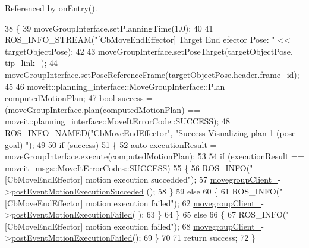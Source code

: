 Referenced by on\+Entry().


\begin{DoxyCode}
38 \{
39     moveGroupInterface.setPlanningTime(1.0);
40 
41     ROS\_INFO\_STREAM(\textcolor{stringliteral}{"[CbMoveEndEffector] Target End efector Pose: "} << targetObjectPose);
42 
43     moveGroupInterface.setPoseTarget(targetObjectPose, \hyperlink{classmoveit__z__client_1_1CbMoveEndEffector_abd92e9d3d67bdde11f9e38e0b44a2b8b}{tip\_link\_});
44     moveGroupInterface.setPoseReferenceFrame(targetObjectPose.header.frame\_id);
45 
46     moveit::planning\_interface::MoveGroupInterface::Plan computedMotionPlan;
47     \textcolor{keywordtype}{bool} success = (moveGroupInterface.plan(computedMotionPlan) == 
      moveit::planning\_interface::MoveItErrorCode::SUCCESS);
48     ROS\_INFO\_NAMED(\textcolor{stringliteral}{"CbMoveEndEffector"}, \textcolor{stringliteral}{"Success Visualizing plan 1 (pose goal) %
      "});
49 
50     \textcolor{keywordflow}{if} (success)
51     \{
52         \textcolor{keyword}{auto} executionResult = moveGroupInterface.execute(computedMotionPlan);
53 
54         \textcolor{keywordflow}{if} (executionResult == moveit\_msgs::MoveItErrorCodes::SUCCESS)
55         \{
56             ROS\_INFO(\textcolor{stringliteral}{"[CbMoveEndEffector] motion execution succedded"});
57             \hyperlink{classmoveit__z__client_1_1CbMoveEndEffector_af62a434c16849885a085e30b8ae70e00}{movegroupClient\_}->\hyperlink{classmoveit__z__client_1_1ClMoveGroup_ad6b8f0acbe3d11b5c39a83911a3d95b8}{postEventMotionExecutionSucceded}
      ();
58         \}
59         \textcolor{keywordflow}{else}
60         \{
61             ROS\_INFO(\textcolor{stringliteral}{"[CbMoveEndEffector] motion execution failed"});
62             \hyperlink{classmoveit__z__client_1_1CbMoveEndEffector_af62a434c16849885a085e30b8ae70e00}{movegroupClient\_}->\hyperlink{classmoveit__z__client_1_1ClMoveGroup_a42bede73264ae2d5dfe0117315042acb}{postEventMotionExecutionFailed}(
      );
63         \}
64     \}
65     \textcolor{keywordflow}{else}
66     \{
67         ROS\_INFO(\textcolor{stringliteral}{"[CbMoveEndEffector] motion execution failed"});
68         \hyperlink{classmoveit__z__client_1_1CbMoveEndEffector_af62a434c16849885a085e30b8ae70e00}{movegroupClient\_}->\hyperlink{classmoveit__z__client_1_1ClMoveGroup_a42bede73264ae2d5dfe0117315042acb}{postEventMotionExecutionFailed}();
69     \}
70 
71     \textcolor{keywordflow}{return} success;
72 \}
\end{DoxyCode}
